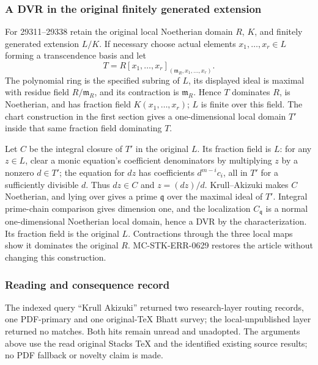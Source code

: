 \subsubsection{A DVR in the original finitely generated extension}\label{algebra-proof-028-a-dvr-in-the-original-finitely-generated-extension}

For 29311--29338 retain the original local Noetherian domain \(R\), \(K\), and finitely generated extension \(L/K\). If necessary choose actual elements \(x_1,\ldots,x_r\in L\) forming a transcendence basis and let \[
 T=R[x_1,\ldots,x_r]_{(\mathfrak m_R,x_1,\ldots,x_r)}.
\] The polynomial ring is the specified subring of \(L\), its displayed ideal is maximal with residue field \(R/\mathfrak m_R\), and its contraction is \(\mathfrak m_R\). Hence \(T\) dominates \(R\), is Noetherian, and has fraction field \(K(x_1,\ldots,x_r)\); \(L\) is finite over this field. The chart construction in the first section gives a one-dimensional local domain \(T'\) inside that same fraction field dominating \(T\).

Let \(C\) be the integral closure of \(T'\) in the original \(L\). Its fraction field is \(L\): for any \(z\in L\), clear a monic equation's coefficient denominators by multiplying \(z\) by a nonzero \(d\in T'\); the equation for \(dz\) has coefficients \(d^{m-i}c_i\), all in \(T'\) for a sufficiently divisible \(d\). Thus \(dz\in C\) and \(z=(dz)/d\). Krull--Akizuki makes \(C\) Noetherian, and lying over gives a prime \(\mathfrak q\) over the maximal ideal of \(T'\). Integral prime-chain comparison gives dimension one, and the localization \(C_{\mathfrak q}\) is a normal one-dimensional Noetherian local domain, hence a DVR by the characterization. Its fraction field is the original \(L\). Contractions through the three local maps show it dominates the original \(R\). MC-\AlgebraIdentifierBreak{}STK-\AlgebraIdentifierBreak{}ERR-\AlgebraIdentifierBreak{}0629 restores the article without changing this construction.

\subsubsection{Reading and consequence record}\label{algebra-proof-028-reading-and-consequence-record}

The indexed query ``Krull Akizuki'' returned two research-layer routing records, one PDF-primary and one original-TeX Bhatt survey; the local-unpublished layer returned no matches. Both hits remain unread and unadopted. The arguments above use the read original Stacks TeX and the identified existing source results; no PDF fallback or novelty claim is made.

